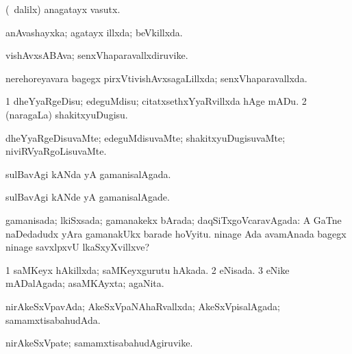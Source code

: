 {{\bentry
{} 
\gl{\nA}
\bmng
(\sA\ \bava dalilx) anagatayx vasutx. 
\emng
\eentry

\bentry
{} 
\gl{\gu}
\bmng
anAvashayxka; agatayx illxda; beVkillxda. 
\emng
\eentry

\bentry
{} 
\gl{\nA}
\expl{}
\bmng
vishAvxsABAva; senxVhaparavallxdiruvike. 
\emng
\eentry

\bentry
{} 
\gl{\gu}
\expl{}
\bmng
nerehoreyavara bagegx pirxVtivishAvxsagaLillxda; senxVhaparavallxda. 
\emng
\eentry

\bentry
{} 
\gl{\sakirx}
\expl{}
\bmng
\bnum
\num{1} dheYyaRgeDisu; edeguMdisu; citatxsethxYyaRvillxda hAge mADu. 
\num{2} (naragaLa) shakitxyuDugisu. 
\enum
\emng
\eentry

\bentry
{} 
\gl{\kirxvi}
\expl{}
\bmng
dheYyaRgeDisuvaMte; edeguMdisuvaMte; shakitxyuDugisuvaMte; niviRVyaRgoLisuvaMte. 
\emng
\eentry

\bentry
{} 
\gl{\gu}
\expl{}
\bmng
sulBavAgi kANda yA gamanisalAgada. 
\emng
\eentry

\bentry
{} 
\gl{\kirxvi}
\expl{}
\bmng
sulBavAgi kANde yA gamanisalAgade. 
\emng
\eentry

\bentry
{} 
\gl{\gu}
\expl{}
\bmng
gamanisada; lkiSxsada; gamanakekx bArada; daqSiTxgoVcaravAgada:  A GaTne naDedadudx yAra gamanakUkx barade hoVyitu.  ninage Ada avamAnada bagegx ninage savxlpxvU lkaSxyXvillxve? 
\emng
\eentry

\bentry
{} 
\gl{\gu}
\expl{}
\bmng
\bnum
\num{1} saMKeyx hAkillxda; saMKeyxgurutu hAkada. 
\num{2} eNisada. 
\num{3} eNike mADalAgada; asaMKAyxta; agaNita. 
\enum
\emng
\eentry

\bentry
{} 
\gl{\saMkiSx}
\expl{}
\bmng
{} 
\emng
\eentry

\bentry
{} 
\gl{\gu}
\expl{}
\bmng
nirAkeSxVpavAda; AkeSxVpaNAhaRvallxda; AkeSxVpisalAgada; samamxtisabahudAda. 
\emng
\eentry

\bentry
{} 
\gl{\nA}
\expl{}
\bmng
nirAkeSxVpate; samamxtisabahudAgiruvike. 
\emng
\eentry

}}
